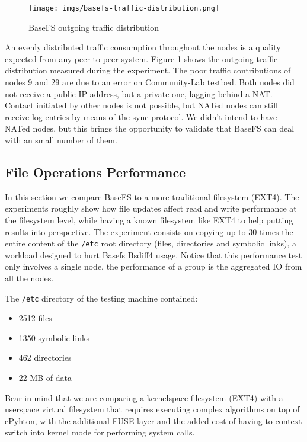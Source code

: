 \documentclass{sig-alternate}
\begin{document}
\begin{figure}
\centering
\texttt{[image: imgs/basefs-traffic-distribution.png]}
\caption{BaseFS outgoing traffic distribution}
\label{fig:basefs-traffic-distribution}
\end{figure}


An evenly distributed traffic consumption throughout the nodes is a quality expected from any peer-to-peer system. Figure \ref{fig:basefs-traffic-distribution} shows the outgoing traffic distribution measured during the experiment. The poor traffic contributions of nodes 9 and 29 are due to an error on Community-Lab testbed. Both nodes did not receive a public IP address, but a private one, lagging behind a NAT. Contact initiated by other nodes is not possible, but NATed nodes can still receive log entries by means of the sync protocol. We didn't intend to have NATed nodes, but this brings the opportunity to validate that BaseFS can deal with an small number of them. 



\subsection{File Operations Performance}
    
In this section we compare BaseFS to a more traditional filesystem (EXT4). The experiments roughly show how file updates affect read and write performance at the filesystem level, while having a known filesystem like EXT4 to help putting results into perspective. The experiment consists on copying up to 30 times the entire content of the \texttt{/etc} root directory (files, directories and symbolic links), a workload designed to hurt Basefs Bsdiff4 usage. Notice that this performance test only involves a single node, the performance of a group is the aggregated IO from all the nodes.

The \texttt{/etc} directory of the testing machine contained:

\begin{itemize}
 \item 2512 files
 \item 1350 symbolic links
 \item 462 directories
 \item 22 MB of data
\end{itemize}

Bear in mind that we are comparing a kernelspace filesystem (EXT4) with a userspace virtual filesystem that requires executing complex algorithms on top of cPyhton, with the additional FUSE layer and the added cost of having to context switch into kernel mode for performing system calls.
\end{document}
